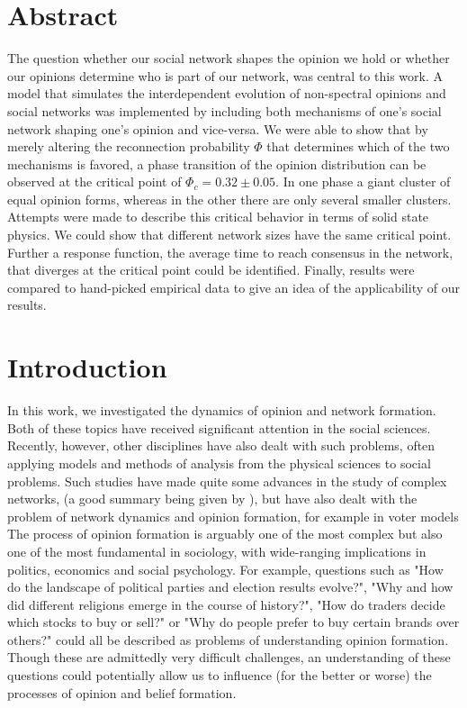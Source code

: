 \documentclass[11pt]{article}
\begin{document}
\section{Abstract}


The question whether our social network shapes the opinion we hold or whether our opinions determine who is part of our network, was central to this work. A model that simulates the interdependent evolution of non-spectral opinions and social networks was implemented by including both mechanisms of one's social network shaping one's opinion and vice-versa. We were able to show that by merely altering the reconnection probability $\Phi$ that determines which of the two mechanisms is favored, a phase transition of the opinion distribution can be observed at the critical point of $\Phi_c=0.32 \pm 0.05$. In one phase a giant cluster of equal opinion forms, whereas in the other there are only several smaller clusters. Attempts were made to describe this critical behavior in terms of solid state physics. We could show that different network sizes have the same critical point. Further a response function, the average time to reach consensus in the network, that diverges at the critical point could be identified. Finally, results were compared to hand-picked empirical data to give an idea of the applicability of our results.


\section{Introduction}

In this work, we investigated the dynamics of opinion and network formation. Both of these topics have received significant attention in the social sciences. Recently, however, other disciplines have also dealt with such problems, often applying models and methods of analysis from the physical sciences to social problems. Such studies have made quite some advances in the study of complex networks, (a good summary being given by \cite{review}), but have also dealt with the problem of network dynamics and opinion formation, for example in voter models \cite{voter model small world, voter model 2} \\


The process of opinion formation is arguably one of the most complex but also one of the most fundamental in sociology, with wide-ranging implications in politics, economics and social psychology. For example, questions such as "How do the landscape of political parties and election results evolve?", "Why and how did different religions emerge in the course of history?", "How do traders decide which stocks to buy or sell?" or "Why do people prefer to buy certain brands over others?" could all be described as problems of understanding opinion formation. Though these are admittedly very difficult challenges, an understanding of these questions could potentially allow us to influence (for the better or worse) the processes of opinion and belief formation. \\
\end{document}
